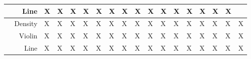 \begin{table}[!]
\begin{tabular}{|cr|p{2.2mm}|p{2.2mm}|p{2.2mm}|p{2.2mm}|p{2.2mm}|p{2.2mm}|p{2.2mm}|p{2.2mm}|p{2.2mm}|p{2.2mm}|p{2.2mm}|p{2.2mm}|p{2.2mm}|p{2.2mm}|p{2.2mm}|p{2.2mm}|}
		\multicolumn{1}{|r|}{}                                       & Line                                  & X                                 & X                                 & X                                         & X                                   & X                                 & X                             & X                                      & X                                                    & X                                     & X                                  & X                                    & X                              & X                                      & X                          & X                             &   \\ \hline
		\multicolumn{1}{|c|}{\multirow{3}{*}{\rotatebox{90}{Agent}}} & Density                               & X                                 & X                                 & X                                         & X                                   & X                                 & X                             & X                                      & X                                                    & X                                     & X                                  & X                                    & X                              & X                                      & X                          & X                             & X \\ \cline{2-18}
		\multicolumn{1}{|r|}{}                                       & Violin                                & X                                 & X                                 & X                                         & X                                   & X                                 & X                             & X                                      & X                                                    & X                                     & X                                  & X                                    & X                              & X                                      & X                          & X                             & X \\ \cline{2-18}
		\multicolumn{1}{|r|}{}                                       & Line                                  & X                                 & X                                 & X                                         & X                                   & X                                 & X                             & X                                      & X                                                    & X                                     & X                                  & X                                    & X                              & X                                      & X                          & X                             & X \\ \hline

\end{tabular}
\end{table}
